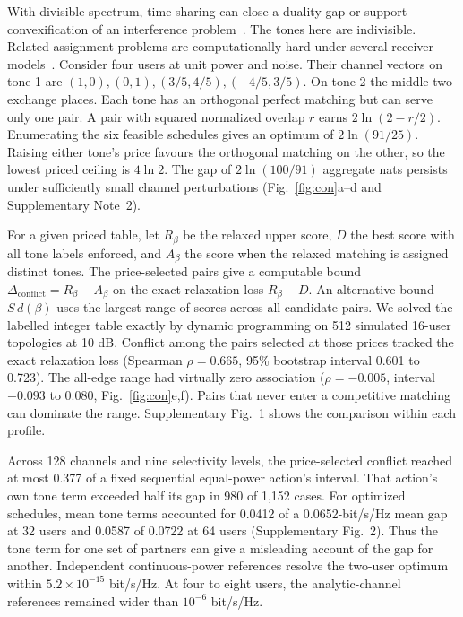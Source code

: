 \documentclass[lineno,pdflatex,sn-nature]{sn-jnl}
\begin{document}
With divisible spectrum, time sharing can close a duality gap or support convexification of an interference problem~\cite{yului,zhaopottie}. The tones here are indivisible. Related assignment problems are computationally hard under several receiver models~\cite{dyer,razaviyayn,salaun}. Consider four users at unit power and noise. Their channel vectors on tone 1 are \((1,0),(0,1),(3/5,4/5),(-4/5,3/5)\). On tone 2 the middle two exchange places. Each tone has an orthogonal perfect matching but can serve only one pair. A pair with squared normalized overlap \(r\) earns \(2\ln(2-r/2)\). Enumerating the six feasible schedules gives an optimum of \(2\ln(91/25)\). Raising either tone's price favours the orthogonal matching on the other, so the lowest priced ceiling is \(4\ln2\). The gap of \(2\ln(100/91)\) aggregate nats persists under sufficiently small channel perturbations (Fig.~\ref{fig:con}a--d and Supplementary Note~2).


For a given priced table, let \(R_\beta\) be the relaxed upper score, \(D\) the best score with all tone labels enforced, and \(A_\beta\) the score when the relaxed matching is assigned distinct tones. The price-selected pairs give a computable bound \(\Delta_{\mathrm{conflict}}=R_\beta-A_\beta\) on the exact relaxation loss \(R_\beta-D\). An alternative bound \(S\,d(\beta)\) uses the largest range of scores across all candidate pairs. We solved the labelled integer table exactly by dynamic programming on 512 simulated 16-user topologies at 10 dB. Conflict among the pairs selected at those prices tracked the exact relaxation loss (Spearman \(\rho=0.665\), 95\% bootstrap interval 0.601 to 0.723). The all-edge range had virtually zero association (\(\rho=-0.005\), interval \(-0.093\) to \(0.080\), Fig.~\ref{fig:con}e,f). Pairs that never enter a competitive matching can dominate the range. Supplementary Fig.~1 shows the comparison within each profile.


Across 128 channels and nine selectivity levels, the price-selected conflict reached at most 0.377 of a fixed sequential equal-power action's interval. That action's own tone term exceeded half its gap in 980 of 1,152 cases. For optimized schedules, mean tone terms accounted for 0.0412 of a 0.0652-bit/s/Hz mean gap at 32 users and 0.0587 of 0.0722 at 64 users (Supplementary Fig.~2). Thus the tone term for one set of partners can give a misleading account of the gap for another. Independent continuous-power references resolve the two-user optimum within \(5.2\times10^{-15}\) bit/s/Hz. At four to eight users, the analytic-channel references remained wider than \(10^{-6}\) bit/s/Hz.
\end{document}
